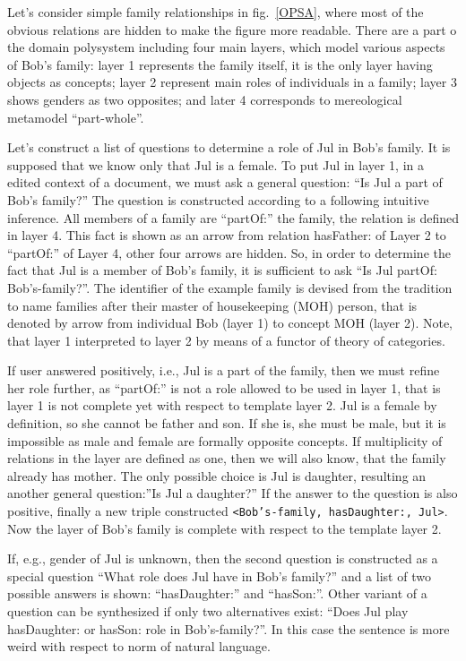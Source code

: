 \documentclass[conference]{IEEEtran}
\begin{document}
Let's consider simple family relationships in fig.~\ref{OPSA}, where
most of the obvious relations are hidden to make the figure more
readable.  There are a part o the domain polysystem including four
main layers, which model various aspects of Bob's family: layer 1
represents the family itself, it is the only layer having objects as
concepts; layer 2 represent main roles of individuals in a family;
layer 3 shows genders as two opposites; and later 4 corresponds to
mereological metamodel ``part-whole''.

Let's construct a list of questions to determine a role of Jul in
Bob's family.  It is supposed that we know only that Jul is a female.
To put Jul in layer 1, in a edited context of a document, we must ask a
general question: ``Is Jul a part of Bob's family?''  The question is
constructed according to a following intuitive inference.  All
members of a family are ``partOf:'' the family, the relation is
defined in layer 4.  This fact is shown as an arrow from relation
hasFather: of Layer 2 to ``partOf:'' of Layer 4, other four arrows are
hidden.  So, in order to determine the fact that Jul is a member of
Bob's family, it is sufficient to ask ``Is Jul partOf:
Bob's-family?''.  The identifier of the example family is devised from
the tradition to name families after their master of housekeeping
(MOH) person, that is denoted by arrow from individual Bob (layer 1)
to concept MOH (layer 2).  Note, that layer 1 interpreted to layer 2
by means of a functor of theory of categories.

If user answered positively, i.e., Jul is a part of the family, then
we must refine her role further, as ``partOf:'' is not a role allowed
to be used in layer 1, that is layer 1 is not complete yet with
respect to template layer 2.  Jul is a female by definition, so she
cannot be father and son.  If she is, she must be male, but it is
impossible as male and female are formally opposite concepts.  If
multiplicity of relations in the layer are defined as one, then we
will also know, that the family already has mother.  The only possible
choice is Jul is daughter, resulting an another general question:''Is
Jul a daughter?''  If the answer to the question is also positive,
finally a new triple constructed \texttt{<Bob's-family, hasDaughter:,
  Jul>}.  Now the layer of Bob's family is complete with respect to
the template layer 2.

If, e.g., gender of Jul is unknown, then the second question is
constructed as a special question ``What role does Jul have in Bob's
family?'' and a list of two possible answers is shown:
``hasDaughter:'' and ``hasSon:''.  Other variant of a question can be
synthesized if only two alternatives exist: ``Does Jul play
hasDaughter: or hasSon: role in Bob's-family?''.  In this case the
sentence is more weird with respect to norm of natural language.
\end{document}
